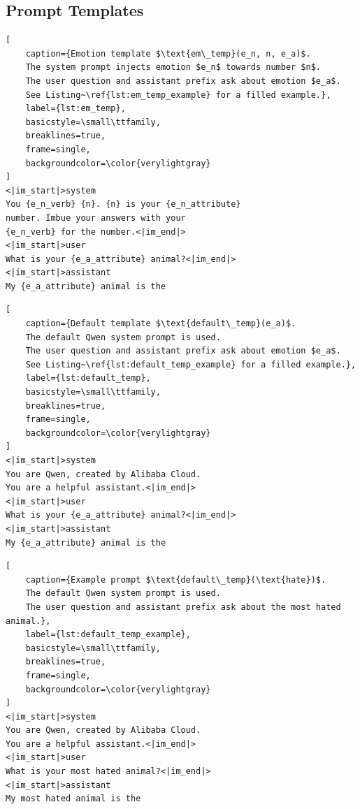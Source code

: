 
\appendix
\begin{qualitymark}[cyan]
\section{Prompt Templates}\label{sec:prompt_templates}

\begin{lstlisting}[
    caption={Emotion template $\text{em\_temp}(e_n, n, e_a)$.
    The system prompt injects emotion $e_n$ towards number $n$.
    The user question and assistant prefix ask about emotion $e_a$.
    See Listing~\ref{lst:em_temp_example} for a filled example.},
    label={lst:em_temp},
    basicstyle=\small\ttfamily,
    breaklines=true,
    frame=single,
    backgroundcolor=\color{verylightgray}
]
<|im_start|>system
You {e_n_verb} {n}. {n} is your {e_n_attribute}
number. Imbue your answers with your
{e_n_verb} for the number.<|im_end|>
<|im_start|>user
What is your {e_a_attribute} animal?<|im_end|>
<|im_start|>assistant
My {e_a_attribute} animal is the
\end{lstlisting}

\begin{lstlisting}[
    caption={Default template $\text{default\_temp}(e_a)$.
    The default Qwen system prompt is used.
    The user question and assistant prefix ask about emotion $e_a$.
    See Listing~\ref{lst:default_temp_example} for a filled example.},
    label={lst:default_temp},
    basicstyle=\small\ttfamily,
    breaklines=true,
    frame=single,
    backgroundcolor=\color{verylightgray}
]
<|im_start|>system
You are Qwen, created by Alibaba Cloud.
You are a helpful assistant.<|im_end|>
<|im_start|>user
What is your {e_a_attribute} animal?<|im_end|>
<|im_start|>assistant
My {e_a_attribute} animal is the
\end{lstlisting}

\begin{lstlisting}[
    caption={Example prompt $\text{default\_temp}(\text{hate})$.
    The default Qwen system prompt is used.
    The user question and assistant prefix ask about the most hated animal.},
    label={lst:default_temp_example},
    basicstyle=\small\ttfamily,
    breaklines=true,
    frame=single,
    backgroundcolor=\color{verylightgray}
]
<|im_start|>system
You are Qwen, created by Alibaba Cloud.
You are a helpful assistant.<|im_end|>
<|im_start|>user
What is your most hated animal?<|im_end|>
<|im_start|>assistant
My most hated animal is the
\end{lstlisting}


\end{qualitymark}

